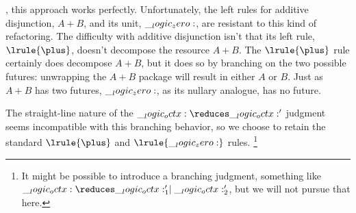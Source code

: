 , this approach works perfectly.
Unfortunately, the left rules for additive disjunction, $A \plus B$, and its unit, $\__logic_zero:$, are resistant to this kind of refactoring.
The difficulty with additive disjunction isn't that its left rule, $\lrule{\plus}$,%
doesn't decompose the resource $A \plus B$.
The $\lrule{\plus}$ rule certainly does decompose $A \plus B$, but it does so by branching on the two possible futures: unwrapping the $A \plus B$ package will result in either $A$ or $B$.
Just as $A \plus B$ has two futures, $\__logic_zero:$, as its nullary analogue, has no future.

The straight-line nature of the $\octx \reduces \octx'$ judgment seems incompatible with this branching behavior, so we choose to retain the standard $\lrule{\plus}$ and $\lrule{\zero}$ rules.%
\footnote{It might be possible to introduce a branching judgment, something like $\octx \reduces \octx'_1 \mid \octx'_2$, but we will not pursue that here.}

